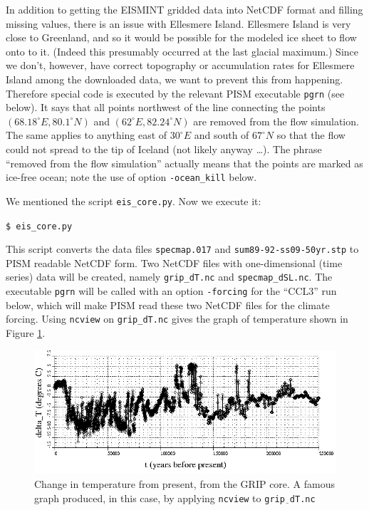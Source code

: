 \documentclass[11pt,final]{amsart}
\newcommand{\und}{$\underline{\,\,\,}$}
\begin{document}
In addition to getting the EISMINT gridded data into NetCDF format and filling missing values, there is an issue with Ellesmere Island.  Ellesmere Island is very close to Greenland, and so it would be possible for the modeled ice sheet to flow onto to it.  (Indeed this presumably occurred at the last glacial maximum.)  Since we don't, however, have correct topography or accumulation rates for Ellesmere Island among the downloaded data, we want to prevent this from happening.  Therefore special code is executed by the relevant PISM executable \verb|pgrn| (see below).  It says that all points northwest of the line connecting the points $(68.18^\circ E, 80.1^\circ N)$ and $(62^\circ E, 82.24^\circ N)$ are removed from the flow simulation.  The same applies to anything east of $30^\circ E$ and south of $67^\circ N$ so that the flow could not spread to the tip of Iceland (not likely anyway \dots).  The phrase ``removed from the flow simulation'' actually means that the points are marked as ice-free ocean; note the use of option \verb|-ocean_kill| below.

We mentioned the script \verb|eis_core.py|.  Now we execute it:

\verb|$ eis_core.py|

\noindent This script converts the data files \verb|specmap.017| and \verb|sum89-92-ss09-50yr.stp| to  PISM readable NetCDF form.  Two NetCDF files with one-dimensional (time series) data will be created, namely \verb|grip_dT.nc| and \verb|specmap_dSL.nc|.  The executable \verb|pgrn| will be called with an option \verb|-forcing| for the ``CCL3'' run below, which will make PISM read these two NetCDF files for the climate forcing.  Using \verb|ncview| on \verb|grip_dT.nc| gives the graph of temperature shown in Figure \ref{fig:gripDeltaT}.

\begin{figure}[ht]
\includegraphics[width=5.6in,keepaspectratio=true]{figs/gripDeltaT}
\caption{Change in temperature from present, from the GRIP core.  A famous graph produced, in this case, by applying \texttt{ncview} to \texttt{grip\und dT.nc}}
\label{fig:gripDeltaT}
\end{figure}
\end{document}
